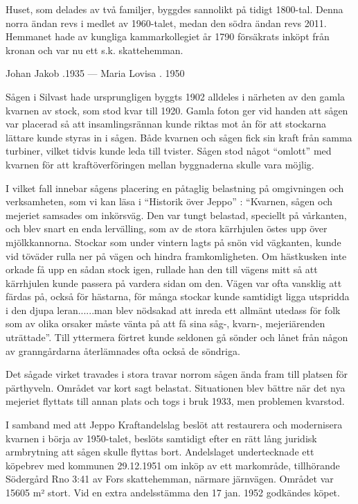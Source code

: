 Huset, som delades av två familjer, byggdes sannolikt på tidigt 1800-tal. Denna norra ändan revs i medlet av 1960-talet, medan den södra ändan revs 2011. Hemmanet hade av kungliga kammarkollegiet år 1790 försäkrats inköpt från kronan och var nu ett s.k. skattehemman.

Johan Jakob .1935  ---  Maria Lovisa . 1950





Sågen i Silvast hade ursprungligen byggts 1902 alldeles i närheten av den gamla kvarnen av stock, som stod kvar till 1920. Gamla foton ger vid handen att sågen var placerad så att insamlingsrännan kunde riktas mot ån för att stockarna lättare kunde styras in i sågen. Både kvarnen och sågen fick sin kraft från samma turbiner, vilket tidvis kunde leda till tvister. Sågen stod något ``omlott'' med kvarnen för att kraftöverföringen mellan byggnaderna skulle vara möjlig.

I vilket fall innebar sågens placering en påtaglig belastning på omgivningen och verksamheten, som vi kan läsa i ``Historik över Jeppo'' : ``Kvarnen, sågen och mejeriet samsades om inkörsväg. Den var tungt belastad, speciellt på vårkanten, och blev snart en enda lervälling, som av de stora kärrhjulen östes upp över mjölkkannorna. Stockar som under vintern lagts på snön vid vägkanten, kunde vid töväder rulla ner på vägen och hindra framkomligheten. Om hästkusken inte orkade få upp en sådan stock igen, rullade han den till vägens mitt så att kärrhjulen kunde passera på vardera sidan om den. Vägen var ofta vansklig att färdas på, också för hästarna, för många stockar kunde samtidigt ligga utspridda i den djupa leran......man blev nödsakad att inreda ett allmänt utedass för folk som av olika orsaker måste vänta på att få sina såg-, kvarn-, mejeriärenden uträttade''. Till yttermera förtret kunde seldonen gå sönder och lånet från någon av granngårdarna återlämnades ofta också de söndriga.

Det sågade virket travades i stora travar norrom sågen ända fram till platsen för pärthyveln. Området var kort sagt belastat. Situationen blev bättre när det nya mejeriet flyttats till annan plats och togs i bruk 1933, men problemen kvarstod.

I samband med att Jeppo Kraftandelslag beslöt att restaurera och modernisera kvarnen i börja av 1950-talet, beslöts samtidigt efter en rätt lång juridisk armbrytning att sågen skulle flyttas bort. Andelslaget undertecknade ett köpebrev med kommunen 29.12.1951 om inköp av ett markområde, tillhörande Södergård Rno 3:41 av Fors skattehemman, närmare järnvägen. Området var 15605 m² stort. Vid en extra andelsstämma den 17 jan. 1952 godkändes köpet.

